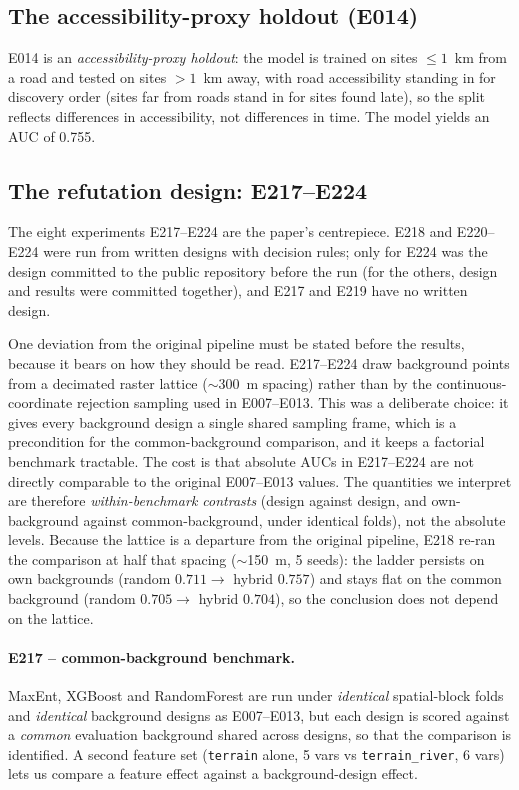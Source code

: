 \documentclass[12pt]{article}
\begin{document}
\subsection{The accessibility-proxy holdout (E014)}
\label{sec:holdout}

E014 is an \emph{accessibility-proxy holdout}: the model is trained on sites $\leq 1$~km from a road and tested on sites $>1$~km away, with road accessibility standing in for discovery order (sites far from roads stand in for sites found late), so the split reflects differences in accessibility, not differences in time.
The model yields an AUC of 0.755.

\subsection{The refutation design: E217--E224}
\label{sec:refutation}

The eight experiments E217--E224 are the paper's centrepiece. E218 and E220--E224 were run from written designs with decision rules; only for E224 was the design committed to the public repository before the run (for the others, design and results were committed together), and E217 and E219 have no written design.

One deviation from the original pipeline must be stated before the results, because it bears on how they should be read.
E217--E224 draw background points from a decimated raster lattice ($\sim$300~m spacing) rather than by the continuous-coordinate rejection sampling used in E007--E013.
This was a deliberate choice: it gives every background design a single shared sampling frame, which is a precondition for the common-background comparison, and it keeps a factorial benchmark tractable.
The cost is that absolute AUCs in E217--E224 are not directly comparable to the original E007--E013 values.
The quantities we interpret are therefore \emph{within-benchmark contrasts} (design against design, and own-background against common-background, under identical folds), not the absolute levels.
Because the lattice is a departure from the original pipeline, E218 re-ran the comparison at half that spacing ($\sim$150~m, 5 seeds): the ladder persists on own backgrounds (random $0.711 \rightarrow$ hybrid $0.757$) and stays flat on the common background (random $0.705 \rightarrow$ hybrid $0.704$), so the conclusion does not depend on the lattice.

\paragraph{E217 -- common-background benchmark.}
MaxEnt, XGBoost and RandomForest are run under \emph{identical} spatial-block folds and \emph{identical} background designs as E007--E013, but each design is scored against a \emph{common} evaluation background shared across designs, so that the comparison is identified.
A second feature set (\texttt{terrain} alone, 5 vars vs \texttt{terrain\_river}, 6 vars) lets us compare a feature effect against a background-design effect.
\end{document}
